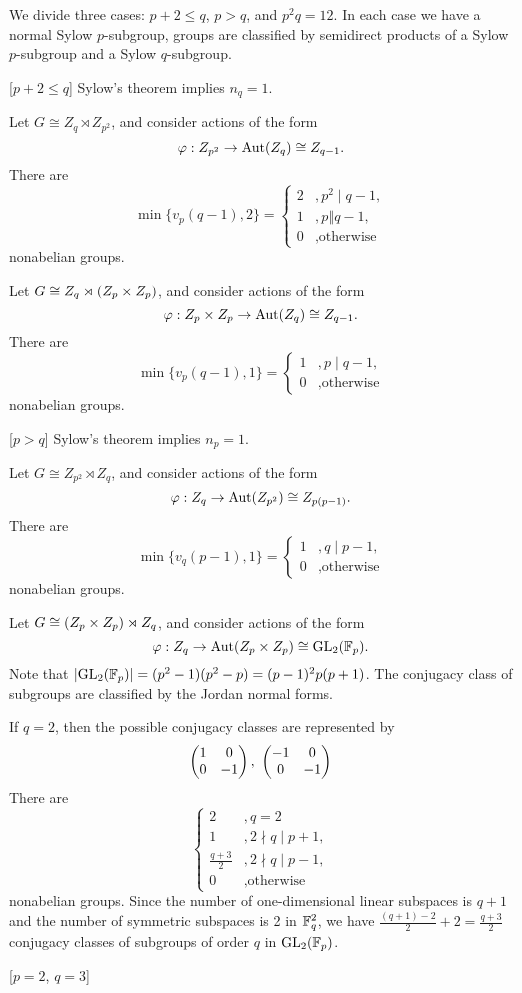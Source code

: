 \documentclass{../exp}
\newcommand{\edv}{\mathrel\Vert}
\begin{document}
\begin{ex}[$|G|=p^2q$]
We divide three cases: $p+2\le q$, $p>q$, and $p^2q=12$.
In each case we have a normal Sylow $p$-subgroup, groups are classified by semidirect products of a Sylow $p$-subgroup and a Sylow $q$-subgroup.

\bigskip
{}[$p+2\le q$]
Sylow's theorem implies $n_q=1$.
\begin{cond}
\item
Let $G\cong Z_q\rtimes Z_{p^2}$, and consider actions of the form
\[\f:Z_{p^2}\to\Aut(Z_q)\cong Z_{q-1}.\]
There are
\[\min\{v_p(q-1),2\}=\begin{cases}2&,p^2\mid q-1,\\1&,p\edv q-1,\\0&,\text{otherwise}\end{cases}\]
nonabelian groups.
\item
Let $G\cong Z_q\rtimes(Z_p\times Z_p)$, and consider actions of the form
\[\f:Z_p\x Z_p\to\Aut(Z_q)\cong Z_{q-1}.\]
There are
\[\min\{v_p(q-1),1\}=\begin{cases}1&,p\mid q-1,\\0&,\text{otherwise}\end{cases}\]
nonabelian groups.
\end{cond}

\bigskip
{}[$p>q$]
Sylow's theorem implies $n_p=1$.
\begin{cond}
\item
Let $G\cong Z_{p^2}\rtimes Z_q$, and consider actions of the form
\[\f:Z_q\to\Aut(Z_{p^2})\cong Z_{p(p-1)}.\]
There are
\[\min\{v_q(p-1),1\}=\begin{cases}1&,q\mid p-1,\\0&,\text{otherwise}\end{cases}\]
nonabelian groups.
\item
Let $G\cong(Z_p\times Z_p)\rtimes Z_q$, and consider actions of the form
\[\f:Z_q\to\Aut(Z_p\x Z_p)\cong\GL_2(\F_p).\]
Note that $|\mathrm{GL}_2(\mathbb{F}_p)|=(p^2-1)(p^2-p)=(p-1)^2p(p+1)$.
The conjugacy class of subgroups are classified by the Jordan normal forms.

If $q=2$, then the possible conjugacy classes are represented by
\[\mat{1&0\\0&-1},\ \mat{-1&0\\0&-1}\]
There are
\[\begin{cases}2&,q=2\\1&,2\nmid q\mid p+1,\\\frac{q+3}2&,2\nmid q\mid p-1,\\0&,\text{otherwise}\end{cases}\]
nonabelian groups.
Since the number of one-dimensional linear subspaces is $q+1$ and the number of symmetric subspaces is 2 in $\mathbb{F}_q^2$, we have $\frac{(q+1)-2}2+2=\frac{q+3}2$ conjugacy classes of subgroups of order $q$ in $\mathrm{GL}_2(\mathbb{F}_p)$.
\end{cond}

[$p=2$, $q=3$]

\end{ex}
\end{document}
